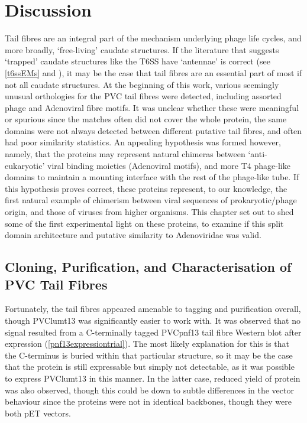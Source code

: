 \section{Discussion}
Tail fibres are an integral part of the mechanism underlying phage life cycles, and more broadly, `free-living' caudate structures. If the literature that suggests `trapped' caudate structures like the T6SS have `antennae' is correct (see \vref{t6ssEMs} and \cite{Chang2017}), it may be the case that tail fibres are an essential part of most if not all caudate structures. At the beginning of this work, various seemingly unusual orthologies for the PVC tail fibres were detected, including assorted phage and Adenoviral fibre motifs. It was unclear whether these were meaningful or spurious since the matches often did not cover the whole protein, the same domains were not always detected between different putative tail fibres, and often had poor similarity statistics. An appealing hypothesis was formed however, namely, that the proteins may represent natural chimeras between `anti-eukaryotic' viral binding moieties (Adenoviral motifs), and more T4 phage-like domains to maintain a mounting interface with the rest of the phage-like tube. If this hypothesis proves correct, these proteins represent, to our knowledge, the first natural example of chimerism between viral sequences of prokaryotic/phage origin, and those of viruses from higher organisms. This chapter set out to shed some of the first experimental light on these proteins, to examine if this split domain architecture and putative similarity to Adenoviridae was valid.

\subsection{Cloning, Purification, and Characterisation of PVC Tail Fibres}
Fortunately, the tail fibres appeared amenable to tagging and purification overall, though PVClumt13 was significantly easier to work with. It was observed that no signal resulted from a C-terminally tagged PVCpnf13 tail fibre Western blot after expression (\vref{pnf13expressiontrial}). The most likely explanation for this is that the C-terminus is buried within that particular structure, so it may be the case that the protein is still expressable but simply not detectable, as it was possible to express PVClumt13 in this manner. In the latter case, reduced yield of protein was also observed, though this could be down to subtle differences in the vector behaviour since the proteins were not in identical backbones, though they were both pET vectors.

